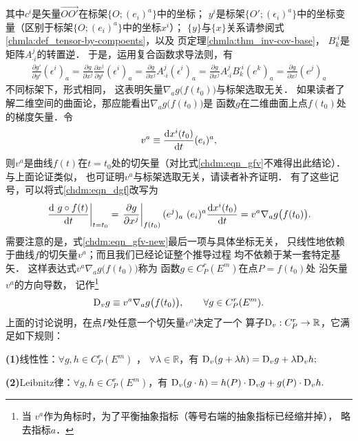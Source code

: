 其中$c^i$是矢量$\overrightarrow{OO'}$在标架$\{O;(e_i)^a\}$中的坐标；
$y^i$是标架$\{O';(\epsilon_i)^a\}$中的坐标变量（区别于标架$\{O;(e_i)^a\}$中的坐标$x^i$）；
$\{y\}$与$\{x\}$关系请参阅式\eqref{chmla:def_tensor-by-compoents}，以及
\pageref{chmla:thm_inv-cov-base}页定理\ref{chmla:thm_inv-cov-base}，
$B^{\cdot i}_k$是矩阵$A^j_{\cdot i}$的转置逆．
于是，运用复合函数求导法则，有
\begin{align}
    \frac{\partial g'}{\partial y^i}(\epsilon^i)_a = 
    \frac{\partial g}{\partial x^j}\frac{\partial x^j}{\partial y^i} (\epsilon^i)_a = 
    \frac{\partial g}{\partial x^j}A^j_{\cdot i} (\epsilon^i)_a = 
    \frac{\partial g}{\partial x^j}A^j_{\cdot i} B^{\cdot i}_k (e^k)_a
    =\frac{\partial g}{\partial x^j} (e^j)_a  \label{chdm:eqn_gpgeA}
\end{align}
不同标架下，形式相同，
这表明矢量$\nabla_a g\bigl(f(t_0)\bigr)$与标架选取无关．
如果读者了解二维空间的曲面论，那应能看出$\nabla_a g\bigl(f(t_0)\bigr)$是
函数$g$在二维曲面上点$f(t_0)$处的梯度矢量．令
\begin{equation} \label{chdm:eqn_vectmp}
    v^a \equiv \frac{{\rm d} x^i(t_0)}{{\rm d}t} (e_i)^a,
\end{equation}
则$v^a$是曲线$f(t)$在$t=t_0$处的切矢量（对比式\eqref{chdm:eqn_gfv}不难得出此结论）．
与上面论证类似，
也可证明$v^a$与标架选取无关，请读者补齐证明．
有了这些记号，可以将式\eqref{chdm:eqn_dgf}改写为
\begin{equation}\label{chdm:eqn_gfv-new}
    \left.\frac{{\rm d}\ g\circ f(t)}{{\rm d}t}\right| _{t=t_0} 
    =\left.\frac{\partial g}{\partial x^j}\right| _{f(t_0)} (e^j)_a
      \ (e_i)^a \frac{{\rm d} x^i(t_0)}{{\rm d}t} 
    =v^a \nabla_a g\bigl(f(t_0)\bigr) .
\end{equation}
需要注意的是，式\eqref{chdm:eqn_gfv-new}最后一项与具体坐标无关，
只线性地依赖于曲线$f$的切矢量$v^a$；而且我们已经论证整个推导过程
均不依赖于某一套特定基矢．
这样表达式$v^a \nabla_a g\bigl(f(t_0)\bigr)$称为
函数$g\in C^r_P(E^m)$在点$P=f(t_0)$处
沿矢量$v^a$的{\heiti 方向导数}，
记作{\footnote{当
        $v^a$作为角标时，为了平衡抽象指标（等号右端的抽象指标已经缩并掉），
        略去指标$a$．}}
\begin{equation}\label{chdm:eqn_vec-in-EV}
    {\rm D}_v g \equiv v^a \nabla_a g\bigl(f(t_0)\bigr), \qquad
    \forall g\in C^r_P(E^m).
\end{equation}
上面的讨论说明，在点$P$处任意一个切矢量$v^a$决定了一个
算子${\rm D}_v:C^r_P \to \mathbb{R}$，它满足如下规则：
\begin{definition}\label{chdm:def_tang-vec-inEV}
    {\bfseries (1)}线性性：$\forall g,h \in C^r_P(E^m) $ ， $\forall \lambda \in \mathbb{R}$，有
    ${\rm D}_v (g+\lambda h) = {\rm D}_v g+ \lambda {\rm D}_v h ;$
    
    
    {\bfseries (2)}Leibnitz律：$\forall g,h \in C^r_P(E^m) $，有
    ${\rm D}_v (g\cdot h) = h(P)\cdot {\rm D}_v g+ g(P)\cdot {\rm D}_v h .$
\end{definition}
